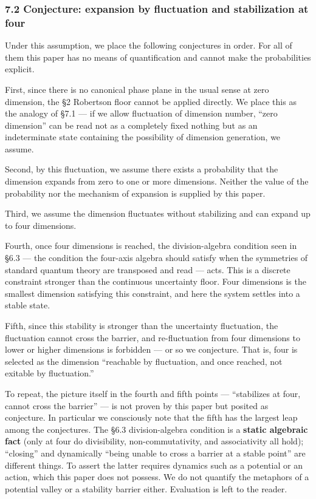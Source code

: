 \documentclass[
]{article}
\begin{document}
\subsubsection{7.2 Conjecture: expansion by fluctuation and
stabilization at
four}\label{conjecture-expansion-by-fluctuation-and-stabilization-at-four}

Under this assumption, we place the following conjectures in order. For
all of them this paper has no means of quantification and cannot make
the probabilities explicit.

First, since there is no canonical phase plane in the usual sense at
zero dimension, the §2 Robertson floor cannot be applied directly. We
place this as the analogy of §7.1 --- if we allow fluctuation of
dimension number, ``zero dimension'' can be read not as a completely
fixed nothing but as an indeterminate state containing the possibility
of dimension generation, we assume.

Second, by this fluctuation, we assume there exists a probability that
the dimension expands from zero to one or more dimensions. Neither the
value of the probability nor the mechanism of expansion is supplied by
this paper.

Third, we assume the dimension fluctuates without stabilizing and can
expand up to four dimensions.

Fourth, once four dimensions is reached, the division-algebra condition
seen in §6.3 --- the condition the four-axis algebra should satisfy when
the symmetries of standard quantum theory are transposed and read ---
acts. This is a discrete constraint stronger than the continuous
uncertainty floor. Four dimensions is the smallest dimension satisfying
this constraint, and here the system settles into a stable state.

Fifth, since this stability is stronger than the uncertainty
fluctuation, the fluctuation cannot cross the barrier, and
re-fluctuation from four dimensions to lower or higher dimensions is
forbidden --- or so we conjecture. That is, four is selected as the
dimension ``reachable by fluctuation, and once reached, not exitable by
fluctuation.''

To repeat, the picture itself in the fourth and fifth points ---
``stabilizes at four, cannot cross the barrier'' --- is not proven by
this paper but posited as conjecture. In particular we consciously note
that the fifth has the largest leap among the conjectures. The §6.3
division-algebra condition is a \textbf{static algebraic fact} (only at
four do divisibility, non-commutativity, and associativity all hold);
``closing'' and dynamically ``being unable to cross a barrier at a
stable point'' are different things. To assert the latter requires
dynamics such as a potential or an action, which this paper does not
possess. We do not quantify the metaphors of a potential valley or a
stability barrier either. Evaluation is left to the reader.
\end{document}
